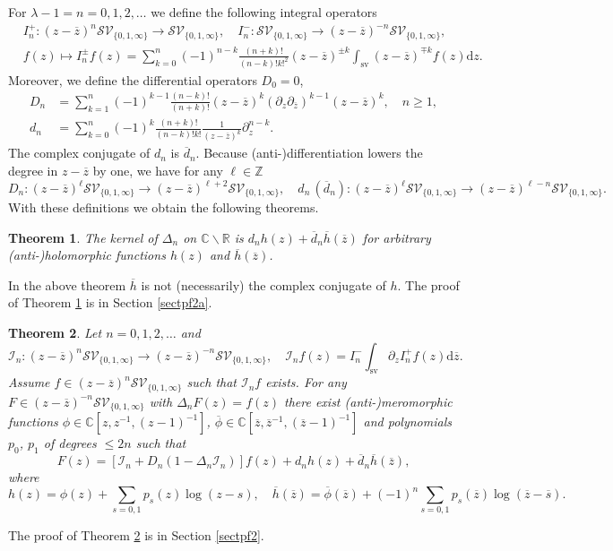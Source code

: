 \documentclass[oneside]{amsart}
\newcommand{\CC}{{\mathbb C}}
\newcommand{\RR}{{\mathbb R}}
\newcommand{\ZZ}{{\mathbb Z}}
\newcommand{\dd}{\mathrm{d}}
\newcommand{\ddd}{{\overline{d}}}
\newcommand{\hh}{{\overline{h}}}
\newcommand{\sss}{{\overline{s}}}
\newcommand{\zz}{{\overline{z}}}
\newcommand{\sI}{\mathcal{I}}
\newcommand{\sS}{\mathcal{S}}
\newcommand{\sV}{\mathcal{V}}
\newcommand{\intsv}{\int_\mathrm{sv}}
\theoremstyle{plain}
\newtheorem{thm}{Theorem}
\begin{document}
For $\lambda-1=n=0,1,2,\ldots$ we define the following integral operators
\begin{align}\label{Ipm}
&I^+_n:(z-\zz)^n\sS\sV_{\{0,1,\infty\}}\rightarrow\sS\sV_{\{0,1,\infty\}},\quad I^-_n:\sS\sV_{\{0,1,\infty\}}\rightarrow(z-\zz)^{-n}\sS\sV_{\{0,1,\infty\}},\nonumber\\
&f(z)\mapsto I^{\pm}_nf(z)=\sum_{k=0}^n(-1)^{n-k}\frac{(n+k)!}{(n-k)!k!^2}(z-\zz)^{\pm k}\intsv(z-\zz)^{\mp k}f(z)\dd z.
\end{align}
Moreover, we define the differential operators $D_0=0$,
\begin{align}\label{Dn}
D_n&=\sum_{k=1}^n(-1)^{k-1}\frac{(n-k)!}{(n+k)!}(z-\zz)^k(\partial_z\partial_\zz)^{k-1}(z-\zz)^k,\quad n\geq1,\nonumber\\
d_n&=\sum_{k=0}^n(-1)^k\frac{(n+k)!}{(n-k)!k!}\frac{1}{(z-\zz)^k}\partial_z^{n-k}.
\end{align}
The complex conjugate of $d_n$ is $\ddd_n$. Because (anti-)differentiation lowers the degree in $z-\zz$ by one, we have for any $\ell\in\ZZ$
\begin{equation}\label{Dndef}
D_n:(z-\zz)^\ell\sS\sV_{\{0,1,\infty\}}\rightarrow(z-\zz)^{\ell+2}\sS\sV_{\{0,1,\infty\}},\quad d_n\,(\ddd_n):(z-\zz)^\ell\sS\sV_{\{0,1,\infty\}}\rightarrow(z-\zz)^{\ell-n}\sS\sV_{\{0,1,\infty\}}.
\end{equation}
With these definitions we obtain the following theorems.

\begin{thm}\label{thm2a}
The kernel of $\Delta_n$ on $\CC\backslash\RR$ is $d_nh(z)+\ddd_n\hh(\zz)$ for arbitrary (anti-)holomorphic functions $h(z)$ and $\hh(\zz)$.
\end{thm}
In the above theorem $\hh$ is not (necessarily) the complex conjugate of $h$. The proof of Theorem \ref{thm2a} is in Section \ref{sectpf2a}.

\begin{thm}\label{thm2}
Let $n=0,1,2,\ldots$ and
\begin{equation}\label{eqIndef}
\sI_n:(z-\zz)^n\sS\sV_{\{0,1,\infty\}}\rightarrow(z-\zz)^{-n}\sS\sV_{\{0,1,\infty\}},\quad\sI_nf(z)=I^-_n\intsv\partial_zI^+_nf(z)\dd\zz.
\end{equation}
Assume $f\in(z-\zz)^n\sS\sV_{\{0,1,\infty\}}$ such that $\sI_nf$ exists. For any $F\in(z-\zz)^{-n}\sS\sV_{\{0,1,\infty\}}$ with $\Delta_nF(z)=f(z)$
there exist (anti-)meromorphic functions $\phi\in\CC[z,z^{-1},(z-1)^{-1}]$, $\overline\phi\in\CC[\zz,\zz^{-1},(\zz-1)^{-1}]$ and polynomials $p_0$, $p_1$ of degrees $\leq2n$ such that
\begin{equation}\label{eqthm2}
F(z)=[\sI_n+D_n(1-\Delta_n\sI_n)]f(z)+d_nh(z)+\ddd_n\hh(\zz),
\end{equation}
where
\begin{equation}\label{eqhdef}
h(z)=\phi(z)+\sum_{s=0,1}p_s(z)\log(z-s),\quad\hh(\zz)=\overline{\phi}(\zz)+(-1)^n\sum_{s=0,1}p_s(\zz)\log(\zz-\sss).
\end{equation}
\end{thm}
The proof of Theorem \ref{thm2} is in Section \ref{sectpf2}.
\end{document}
